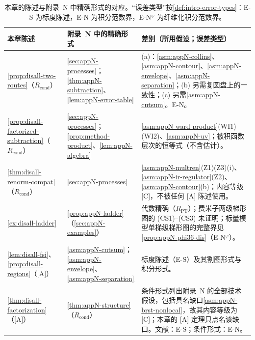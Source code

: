 \begin{table}[htbp]
\centering
\caption{本章的陈述与附录~N 中精确形式的对应。“误差类型”按\cref{def:intro-error-types}：E-S 为标度陈述，E-N 为积分范数界，E-N$^\varphi$ 为纤维化积分范数界。}
\label{tab:disall-correspondence}
\small
\begin{tabularx}{\textwidth}{@{}>{\raggedright\arraybackslash}p{}>{\raggedright\arraybackslash}p{}>{\raggedright\arraybackslash}X@{}}
\toprule
本章陈述 & 附录~N 中的精确形式 & 差别（所用假设；误差类型） \\
\midrule
\cref{prop:disall-two-routes}（$R_{\mathrm{cond}}$） & \cref{sec:appN-processes}；\cref{thm:appN-subtraction}、\cref{lem:appN-error-table} &
(a)：\cref{asm:appN-collins}、\cref{asm:appN-contour}、\cref{asm:appN-envelope}、\cref{asm:appN-separation}；(b) 另需复圆盘上的一致性；(c) 另需\cref{asm:appN-cutsum}。E-N。 \\
\cref{prop:disall-factorized-subtraction}（$R_{\mathrm{cond}}$） & \cref{sec:appN-processes}；\cref{prop:method-product}、\cref{lem:appN-algebra} &
\cref{asm:appN-ward-product}(WI1)(WI2)、\cref{asm:appN-uv}；被积函数层次的恒等式（不含估计）。 \\
\cref{thm:disall-renorm-compat}（$R_{\mathrm{cond}}$） & \cref{sec:appN-processes} &
\cref{asm:appN-multren}(Z1)(Z3)(i)、\cref{asm:appN-ir-regulator}(Z2)、\cref{asm:appN-contour}(b)；内容等级 [C]，不被任何 [A] 陈述使用。 \\
\cref{ex:disall-ladder} & \cref{prop:appN-ladder}（\cref{sec:appN-examples}） &
代数精确（$R_{\mathrm{PT}}$）；费米子两级梯形图的 (CS1)--(CS3) 未证明；标量模型单梯级梯形图的完整界见\cref{prop:appN-phi36-dis}（E-N$^\varphi$）。 \\
\cref{lem:disall-fsi}、\cref{prop:disall-regions}（[A]） & \cref{asm:appN-cutsum}；\cref{asm:appN-envelope}、\cref{asm:appN-separation} &
标度陈述（E-S）及其割图形式与积分形式。 \\
\cref{thm:disall-factorization}（[A]） & \cref{thm:appN-structure}（$R_{\mathrm{cond}}$） &
条件形式列出附录~N 的全部技术假设，包括具名缺口\cref{asm:appN-brst-nonlocal}，故其内容等级为 [C]；本章的 [A] 定理只点名该缺口。文献：E-S；条件形式：E-N。 \\
\bottomrule
\end{tabularx}
\end{table}

